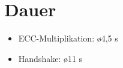 \section{Dauer}

\begin{itemize}
  \item ECC-Multiplikation: \o 4,5 s
  \item Handshake: \o 11 s
\end{itemize}